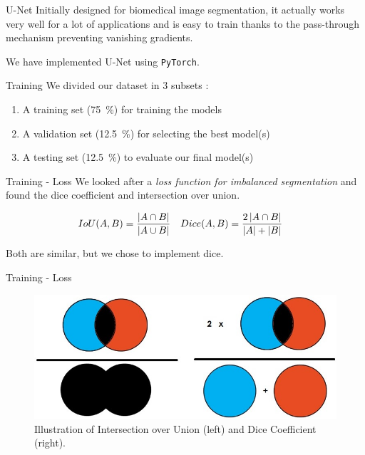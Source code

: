 \documentclass[12pt]{beamer}
\begin{document}
\begin{frame}{U-Net}
    Initially designed for biomedical image segmentation, it actually works very well for a lot of applications and is \alert{easy to train} thanks to the \alert{pass-through} mechanism preventing vanishing gradients.

    We have implemented U-Net using \texttt{PyTorch}.
\end{frame}

\begin{frame}{Training}
    We divided our dataset in 3 subsets :
    \begin{enumerate}
        \item A training set (\SI{75}{\percent}) for training the models
        \item A validation set (\SI{12.5}{\percent}) for selecting the best model(s)
        \item A testing set (\SI{12.5}{\percent}) to evaluate our final model(s)
    \end{enumerate}
\end{frame}

\begin{frame}{Training - Loss}
    We looked after a \emph{loss function for imbalanced segmentation} and found the \alert{dice coefficient} and \alert{intersection over union}.
    
    \begin{align*}
        IoU(A, B) & = \frac{\left|A \cap B\right|}{\left|A \cup B\right|} & Dice(A, B) & = \frac{2 \left|A \cap B\right|}{\left|A\right| + \left|B\right|}
    \end{align*}
    
    Both are similar, but we chose to implement \alert{dice}.
\end{frame}

\begin{frame}{Training - Loss}
    \begin{figure}
        \centering
        \includegraphics[width=\textwidth]{resources/jpg/iou_dice.jpg}
        \caption{Illustration of Intersection over Union (left) and Dice Coefficient (right). \cite{towardsdatascience}}
    \end{figure}
\end{frame}
\end{document}
